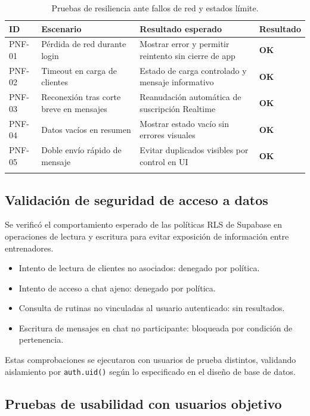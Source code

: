 \begin{longtable}{@{}p{1cm}p{5cm}p{5cm}p{2.5cm}@{}}
\toprule
\textbf{ID} & \textbf{Escenario} & \textbf{Resultado esperado} & \textbf{Resultado} \\
\midrule
\endhead
PNF-01 & Pérdida de red durante login & Mostrar error y permitir reintento sin cierre de app & \textcolor{green!60!black}{\textbf{OK}} \\
PNF-02 & Timeout en carga de clientes & Estado de carga controlado y mensaje informativo & \textcolor{green!60!black}{\textbf{OK}} \\
PNF-03 & Reconexión tras corte breve en mensajes & Reanudación automática de suscripción Realtime & \textcolor{green!60!black}{\textbf{OK}} \\
PNF-04 & Datos vacíos en resumen & Mostrar estado vacío sin errores visuales & \textcolor{green!60!black}{\textbf{OK}} \\
PNF-05 & Doble envío rápido de mensaje & Evitar duplicados visibles por control en UI & \textcolor{green!60!black}{\textbf{OK}} \\
\bottomrule
\caption{Pruebas de resiliencia ante fallos de red y estados límite.}
\end{longtable}

\subsection{Validación de seguridad de acceso a datos}

Se verificó el comportamiento esperado de las políticas RLS de Supabase en operaciones de lectura y escritura para evitar exposición de información entre entrenadores.

\begin{itemize}
  \item Intento de lectura de clientes no asociados: denegado por política.
  \item Intento de acceso a chat ajeno: denegado por política.
  \item Consulta de rutinas no vinculadas al usuario autenticado: sin resultados.
  \item Escritura de mensajes en chat no participante: bloqueada por condición de pertenencia.
\end{itemize}

Estas comprobaciones se ejecutaron con usuarios de prueba distintos, validando aislamiento por \texttt{auth.uid()} según lo especificado en el diseño de base de datos.

\subsection{Pruebas de usabilidad con usuarios objetivo}

